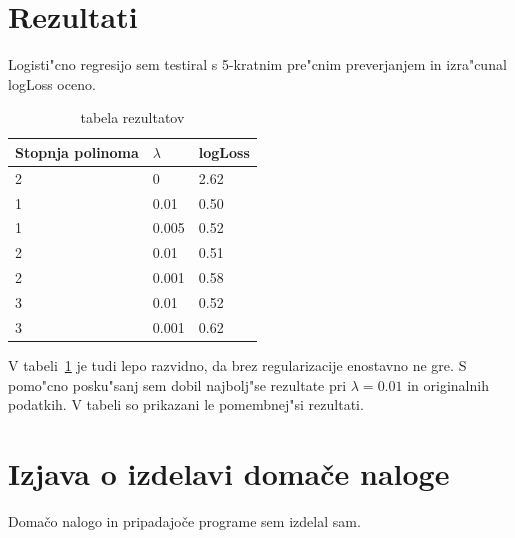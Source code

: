 \documentclass[a4paper,11pt]{article}
\begin{document}
\section{Rezultati}
Logisti"cno regresijo sem testiral s 5-kratnim pre"cnim preverjanjem in izra"cunal logLoss oceno.
\begin{table}[h]
\centering
\begin{tabular}{l|l|l}
Stopnja polinoma & $\lambda$ & logLoss\\
\hline
2 & 0 & 2.62 \\
1 & 0.01 & 0.50 \\
1 & 0.005 & 0.52 \\
2 & 0.01 & 0.51 \\
2 & 0.001 & 0.58 \\
3 & 0.01 & 0.52 \\
3 & 0.001 & 0.62 \\
\end{tabular}
\caption{tabela rezultatov}
\label{t:rez}
\end{table}

V tabeli~\ref{t:rez} je tudi lepo razvidno, da brez regularizacije enostavno ne gre. S pomo"cno posku"sanj sem dobil najbolj"se rezultate pri $\lambda = 0.01$ in originalnih podatkih. V tabeli so prikazani le pomembnej"si rezultati.

\section{Izjava o izdelavi domače naloge}
Domačo nalogo in pripadajoče programe sem izdelal sam.
\end{document}

